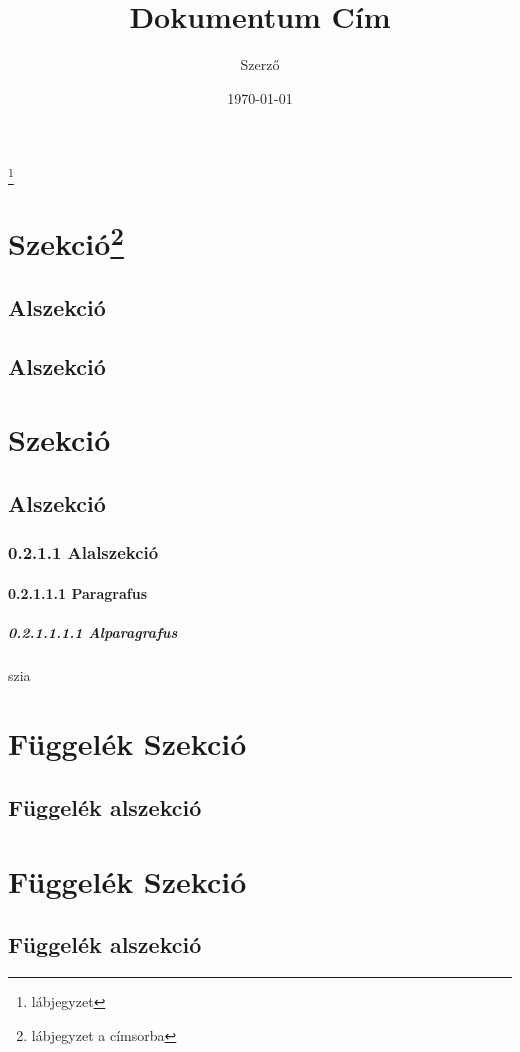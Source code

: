 \documentclass[a4paper,12pt,twoside,twocolumn]{book}
\begin{document}
\title{Dokumentum Cím}
\author{Szerző}
\date{\today}
\maketitle
\hulipsum[2]
\footnote{lábjegyzet}
\setcounter{tocdepth}{3}
\tableofcontents
\newpage
{} 
\section[Szek.]{Szekció\footnote{lábjegyzet a címsorba}}
\hulipsum[2-3]
\subsection{Alszekció}
\hulipsum[10]
\subsection{Alszekció}
\hulipsum[10]
\section{Szekció}
\hulipsum[2-3]
\subsection{Alszekció}
\hulipsum[1]
\subsubsection{0.2.1.1 Alalszekció}
\hulipsum[1]
\paragraph{0.2.1.1.1 Paragrafus}
\hulipsum[1]
\subparagraph{0.2.1.1.1.1 Alparagrafus}
szia
\appendix
\section{Függelék Szekció}
\hulipsum[1]
\subsection{Függelék alszekció}
\hulipsum[1]
\section{Függelék Szekció}
\hulipsum[1]
\subsection{Függelék alszekció}
\hulipsum[1]
\end{document}
